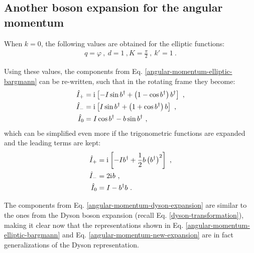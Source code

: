 \subsection{Another boson expansion for the angular momentum}

When $k=0$, the following values are obtained for the elliptic functions:
\begin{align}
    q=\varphi\ ,\ d=1\ , K=\frac{\pi}{2}\ ,\ k'=1\ .
\end{align}

Using these values, the components from Eq. \ref{angular-momentum-elliptic-bargmann} can be re-written, such that in the rotating frame they become:
\begin{align}
    \hat{I}_+&=\mathrm{i}\mkern1mu\left[-I\sin b^\dagger+\left(1-\cos b^\dagger\right)b^\dagger\right]\ ,\nonumber\\
    \hat{I}_-&=\mathrm{i}\mkern1mu\left[I\sin b^\dagger+\left(1+\cos b^\dagger\right)b\right]\ ,\nonumber\\
    \hat{I}_0&=I\cos b^\dagger-b\sin b^\dagger\ ,
    \label{angular-momentum-new-expansion}
\end{align}
which can be simplified even more if the trigonometric functions are expanded and the leading terms are kept:
\begin{align}
    \hat{I}_+&=\iu\left[-Ib^\dagger+\frac{1}{2}b\left(b^\dagger\right)^2\right]\ ,\nonumber\\
    \hat{I}_-&=2\iu b\ ,\nonumber\\
    \hat{I}_0&=I-b^\dagger b\ .
    \label{angular-momentum-dyson-expansion}
\end{align}

The components from Eq. \ref{angular-momentum-dyson-expansion} are similar to the ones from the Dyson boson expansion (recall Eq. \ref{dyson-transformation}), making it clear now that the representations shown in Eq. \ref{angular-momentum-elliptic-bargmann} and Eq. \ref{angular-momentum-new-expansion} are in fact generalizations of the Dyson representation.